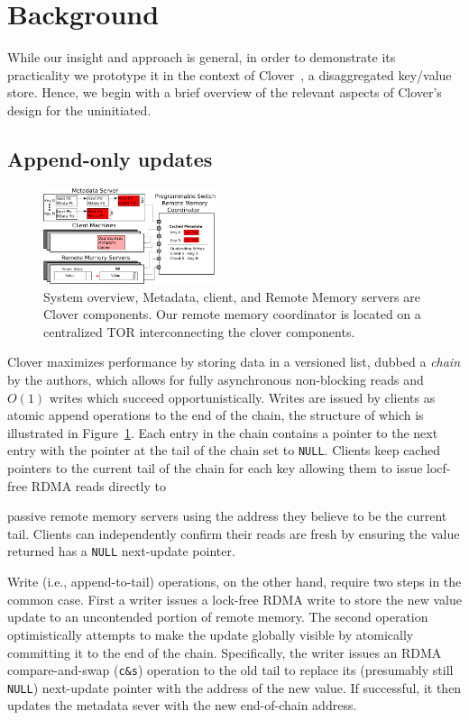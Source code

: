\section{Background}

While our insight and approach is general, in order to demonstrate its
practicality we prototype it in the context of Clover~\cite{clover}, a
disaggregated key/value store.  Hence, we begin with a brief overview
of the relevant aspects of Clover's design for the uninitiated.

\subsection{Append-only updates}

\begin{figure}
    \includegraphics[width=0.45\textwidth]{fig/overview_2.png}
    \caption{ System overview, Metadata, client, and Remote Memory
    servers are Clover components. Our remote memory coordinator is
    located on a centralized TOR interconnecting the clover components.
    }
    \label{fig:overview} 
\end{figure}

Clover maximizes performance by storing data in a versioned list, dubbed a
\emph{chain} by the authors, which allows for fully asynchronous non-blocking
reads and $O(1)$ writes which succeed opportunistically. Writes are issued by
clients as atomic append operations to the end of the chain, the structure of
which is illustrated in Figure~\ref{fig:overview}. Each entry in the chain
contains a pointer to the next entry with the pointer at the tail of the
chain set to \texttt{NULL}. Clients keep cached pointers to the current tail of the
chain for each key allowing them to issue locf-free RDMA reads directly to

passive remote memory servers using the address they believe to be the
current tail. Clients can independently confirm their reads are
fresh by ensuring the value returned has a \texttt{NULL} next-update pointer.

Write (i.e., append-to-tail) operations, on the other hand, require two steps
in the common case. First a writer issues a lock-free RDMA write to store the
new value update to an uncontended portion of remote memory. The
second operation optimistically attempts to make the update globally visible
by atomically committing it to the end of the chain. Specifically, the writer
issues an RDMA compare-and-swap (\texttt{c\&s}) operation to the old tail to replace
its (presumably still \texttt{NULL}) next-update pointer with the address of the
new value. If successful, it then updates the metadata sever with
the new end-of-chain address.

